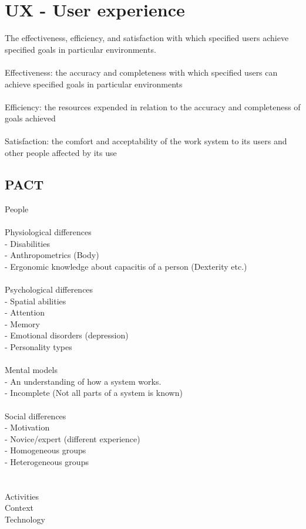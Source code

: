\chapter*{UX - User experience}
The effectiveness, efficiency, and satisfaction with which specified users
achieve specified goals in particular environments.
\\\\
Effectiveness: the accuracy and completeness with which specified users can
achieve specified goals in particular environments
\\\\
Efficiency: the resources expended in relation to the accuracy and
completeness of goals achieved
\\\\
Satisfaction: the comfort and acceptability of the work system to its users and
other people affected by its use
\section*{PACT}
People\\
\\ Physiological differences \\
    - Disabilities\\
    - Anthropometrics (Body)\\
    - Ergonomic knowledge about capacitis of a person (Dexterity etc.)\\
\\ Psychological differences\\
    - Spatial abilities\\
    - Attention\\
    - Memory\\
    - Emotional disorders (depression)\\
    - Personality types\\
\\ Mental models \\
    - An understanding of how a system works. \\
    - Incomplete (Not all parts of a system is known)\\
\\ Social differences\\
    - Motivation\\
    - Novice/expert (different experience)\\
    - Homogeneous groups\\
    - Heterogeneous groups\\
\\\\
Activities\\
Context\\
Technology\\